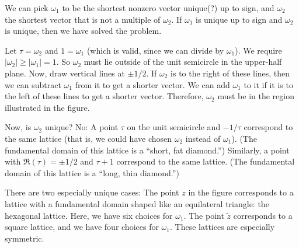 \documentclass[11pt, oneside,margin=1in]{article}
\begin{document}
We can pick $\omega_1$ to be the shortest nonzero vector unique(?) up to sign, and $\omega_2$ the shortest vector that is not a multiple of $\omega_2$. If $\omega_1$ is unique up to sign and $\omega_2$ is unique, then we have solved the problem. 

Let $\tau = \omega_2$ and $1=\omega_1$ (which is valid, since we can divide by $\omega_1$). We require $\left\lvert \omega_2 \right\rvert \ge \left\lvert \omega_1 \right\rvert =1$. So $\omega_2$ must lie outside of the unit semicircle in the upper-half plane. Now, draw vertical lines at $\pm 1/2$. If $\omega_2$ is to the right of these lines, then we can subtract $\omega_1$ from it to get a shorter vector. We can add $\omega_1$ to it if it is to the left of these lines to get a shorter vector. Therefore, $\omega_2$ must be in the region illustrated in the figure.

Now, is $\omega_2$ unique? No: A point $\tau$ on the unit semicircle and $-1/\tau$ correspond to the same lattice (that is, we could have chosen $\omega_2$ instead of $\omega_1$). (The fundamental domain of this lattice is a ``short, fat diamond.'') Similarly, a point with $\Re(\tau) = \pm 1/2$ and $\tau + 1$ correspond to the same lattice. (The fundamental domain of this lattice is a ``long, thin diamond.'')

There are two especially unique cases: The point $z$ in the figure corresponds to a lattice with a fundamental domain shaped like an equilateral triangle: the hexagonal lattice. Here, we have six choices for $\omega_1$. The point $\tilde z$ corresponds to a square lattice, and we have four choices for $\omega_1$. These lattices are especially symmetric.
\end{document}
